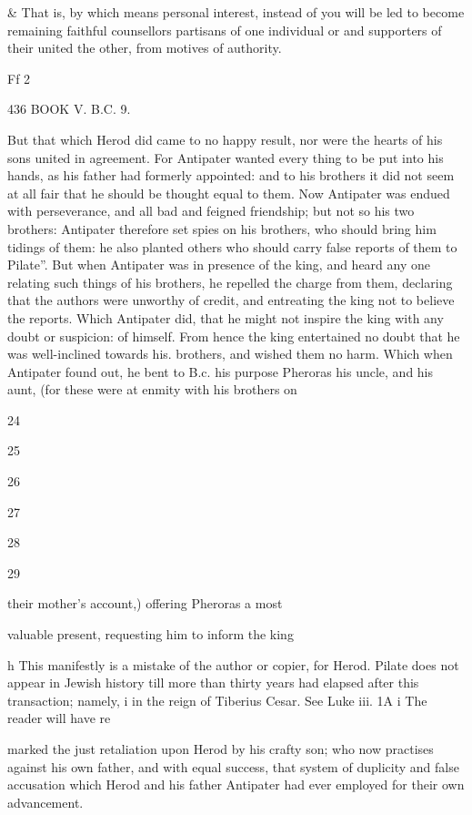 & That is, by which means personal interest, instead of you will be led to become remaining faithful counsellors partisans of one individual or and supporters of their united the other, from motives of authority. 

Ff 2 

436 BOOK V. B.C. 9. 

But that which Herod did came to no happy result, nor were the hearts of his sons united in agreement. For Antipater wanted every thing to be put into his hands, as his father had formerly appointed: and to his brothers it did not seem at all fair that he should be thought equal to them. Now Antipater was endued with perseverance, and all bad and feigned friendship; but not so his two brothers: Antipater therefore set spies on his brothers, who should bring him tidings of them: he also planted others who should carry false reports of them to Pilate”. But when Antipater was in presence of the king, and heard any one relating such things of his brothers, he repelled the charge from them, declaring that the authors were unworthy of credit, and entreating the king not to believe the reports. Which Antipater did, that he might not inspire the king with any doubt or suspicion: of himself. From hence the king entertained no doubt that he was well-inclined towards his. brothers, and wished them no harm. 
Which when Antipater found out, he bent to B.c. his purpose Pheroras his uncle, and his aunt, 
(for these were at enmity with his brothers on 

24 

25 

26 

27 

28 

29 

their mother’s account,) offering Pheroras a most 

valuable present, requesting him to inform the king 

h This manifestly is a mistake of the author or copier, for Herod. Pilate does not appear in Jewish history till more than thirty years had elapsed after this transaction; namely, i in the reign of Tiberius Cesar. See Luke iii. 1A 
i The reader will have re

marked the just retaliation upon Herod by his crafty son; who now practises against his own father, and with equal success, that system of duplicity and false accusation which Herod and his father Antipater had ever employed for their own advancement. 

